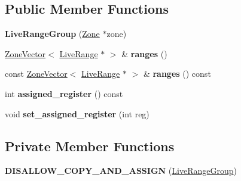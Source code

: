 \subsection*{Public Member Functions}
\begin{DoxyCompactItemize}
\item 
{\bfseries Live\+Range\+Group} (\hyperlink{classv8_1_1internal_1_1_zone}{Zone} $\ast$zone)\hypertarget{classv8_1_1internal_1_1compiler_1_1_live_range_group_a39444f22e998f5441b510915886a7133}{}\label{classv8_1_1internal_1_1compiler_1_1_live_range_group_a39444f22e998f5441b510915886a7133}

\item 
\hyperlink{classv8_1_1internal_1_1_zone_vector}{Zone\+Vector}$<$ \hyperlink{classv8_1_1internal_1_1compiler_1_1_live_range}{Live\+Range} $\ast$ $>$ \& {\bfseries ranges} ()\hypertarget{classv8_1_1internal_1_1compiler_1_1_live_range_group_a64e0a8a7f5ecc1740a81972e6aa22fdb}{}\label{classv8_1_1internal_1_1compiler_1_1_live_range_group_a64e0a8a7f5ecc1740a81972e6aa22fdb}

\item 
const \hyperlink{classv8_1_1internal_1_1_zone_vector}{Zone\+Vector}$<$ \hyperlink{classv8_1_1internal_1_1compiler_1_1_live_range}{Live\+Range} $\ast$ $>$ \& {\bfseries ranges} () const \hypertarget{classv8_1_1internal_1_1compiler_1_1_live_range_group_a46384ac45a0b01af137f12a66de5e460}{}\label{classv8_1_1internal_1_1compiler_1_1_live_range_group_a46384ac45a0b01af137f12a66de5e460}

\item 
int {\bfseries assigned\+\_\+register} () const \hypertarget{classv8_1_1internal_1_1compiler_1_1_live_range_group_a93933ba332e6afb5820d374d8987f024}{}\label{classv8_1_1internal_1_1compiler_1_1_live_range_group_a93933ba332e6afb5820d374d8987f024}

\item 
void {\bfseries set\+\_\+assigned\+\_\+register} (int reg)\hypertarget{classv8_1_1internal_1_1compiler_1_1_live_range_group_ae5ca9e9ff3e4817300c6aad9a2dec72e}{}\label{classv8_1_1internal_1_1compiler_1_1_live_range_group_ae5ca9e9ff3e4817300c6aad9a2dec72e}

\end{DoxyCompactItemize}
\subsection*{Private Member Functions}
\begin{DoxyCompactItemize}
\item 
{\bfseries D\+I\+S\+A\+L\+L\+O\+W\+\_\+\+C\+O\+P\+Y\+\_\+\+A\+N\+D\+\_\+\+A\+S\+S\+I\+GN} (\hyperlink{classv8_1_1internal_1_1compiler_1_1_live_range_group}{Live\+Range\+Group})\hypertarget{classv8_1_1internal_1_1compiler_1_1_live_range_group_a881eeffb6927462514bc02d191757061}{}\label{classv8_1_1internal_1_1compiler_1_1_live_range_group_a881eeffb6927462514bc02d191757061}

\end{DoxyCompactItemize}
